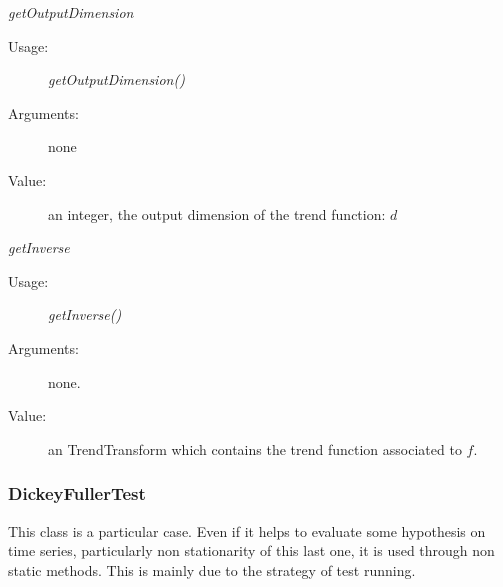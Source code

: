 \begin{description}
\begin{description}
\item \textit{getOutputDimension}
\begin{description}
\item[Usage:] \textit{getOutputDimension()}
\item[Arguments:] none
\item[Value:]   an integer, the output dimension of the trend function: $d$
\end{description}
\bigskip

\item \textit{getInverse}
\begin{description}
\item[Usage:] \textit{getInverse()}
\item[Arguments:] none.
\item[Value:]   an TrendTransform which contains the  trend function associated to $f$.
\end{description}
\bigskip



\end{description}

\end{description}

\newpage     \subsubsection{DickeyFullerTest}

This class is a particular case.
Even if it helps to evaluate some hypothesis on time series, particularly non stationarity of this last one, it is used
through non static methods. This is mainly due to the strategy of test running.

